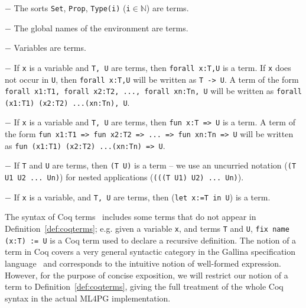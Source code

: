 \begin{definition}\label{def:coqterms}

$-$ The sorts \lstinline?Set?, \lstinline?Prop?, \lstinline?Type(i)? (\lstinline?i?$\in \mathbb{N}$) are terms.

$-$ The global names of the environment are terms.

$-$ Variables are terms.

$-$ If \lstinline?x? is a variable and \lstinline?T, U? are terms, then \lstinline?forall x:T,U?
 is a term. If \lstinline?x? does not occur in \lstinline?U?, then \lstinline?forall x:T,U? will be written as \lstinline?T -> U?. A term of the
 form \lstinline?forall x1:T1, forall x2:T2, ..., forall xn:Tn, U? will be written as \lstinline?forall (x1:T1) (x2:T2) ...(xn:Tn), U?.

$-$ If \lstinline?x? is a variable and \lstinline?T, U? are terms, then \lstinline?fun x:T => U?
 is a term. A term of the form \lstinline?fun x1:T1 => fun x2:T2 => ... => fun xn:Tn => U? will be written as \lstinline?fun (x1:T1) (x2:T2) ...(xn:Tn) => U?.

 $-$ If \lstinline?T? and \lstinline?U? are terms, then \lstinline?(T U)? is a term -- we use an uncurried notation (\lstinline?(T U1 U2 ... Un)?)
 for nested applications (\lstinline?(((T U1) U2) ... Un)?).

 $-$ If \lstinline?x? is a variable, and \lstinline?T, U? are terms, then (\lstinline?let x:=T in U?) is a term.

\end{definition}

The syntax of Coq terms~\cite{Coq} includes some terms that do not appear in Definition~\ref{def:coqterms}; e.g. given
 a variable \lstinline?x?, and  terms \lstinline?T? and \lstinline?U?, \lstinline?fix name (x:T) := U? is a Coq term used to declare a recursive definition.
The notion of a term in Coq covers a very general syntactic
category in the Gallina specification language~\cite{Coq} and corresponds to the intuitive notion of well-formed expression.
However, for the purpose of concise exposition,
we will restrict our notion of a term to Definition~\ref{def:coqterms},
giving the full treatment of the whole Coq syntax in the actual ML4PG implementation.


